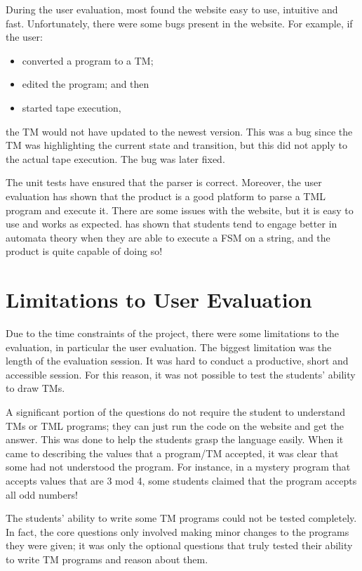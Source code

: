 During the user evaluation, most found the website easy to use, intuitive and fast. Unfortunately, there were some bugs present in the website. For example, if the user:
\begin{itemize}
    \item converted a program to a TM;
    \item edited the program; and then
    \item started tape execution,
\end{itemize}
the TM would not have updated to the newest version. This was a bug since the TM was highlighting the current state and transition, but this did not apply to the actual tape execution. The bug was later fixed.

The unit tests have ensured that the parser is correct. Moreover, the user evaluation has shown that the product is a good platform to parse a TML program and execute it. There are some issues with the website, but it is easy to use and works as expected. \citet{rodger2009increasing} has shown that students tend to engage better in automata theory when they are able to execute a FSM on a string, and the product is quite capable of doing so!

\section{Limitations to User Evaluation}
Due to the time constraints of the project, there were some limitations to the evaluation, in particular the user evaluation. The biggest limitation was the length of the evaluation session. It was hard to conduct a productive, short and accessible session. For this reason, it was not possible to test the students' ability to draw TMs. 

A significant portion of the questions do not require the student to understand TMs or TML programs; they can just run the code on the website and get the answer. This was done to help the students grasp the language easily. When it came to describing the values that a program/TM accepted, it was clear that some had not understood the program. For instance, in a mystery program that accepts values that are 3 mod 4, some students claimed that the program accepts all odd numbers!

The students' ability to write some TM programs could not be tested completely. In fact, the core questions only involved making minor changes to the programs they were given; it was only the optional questions that truly tested their ability to write TM programs and reason about them.

